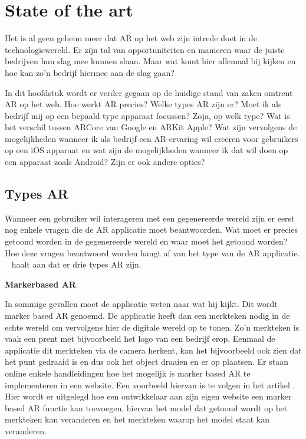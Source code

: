 \chapter{State of the art}
\label{ch:stand-van-zaken}



Het is al geen geheim meer dat AR op het web zijn intrede doet in de technologiewereld. Er zijn tal van opportuniteiten en manieren waar de juiste bedrijven hun slag mee kunnen slaan. Maar wat komt hier allemaal bij kijken en hoe kan zo'n bedrijf hiermee aan de slag gaan? 

In dit hoofdstuk wordt er verder gegaan op de huidige stand van zaken omtrent AR op het web. Hoe werkt AR precies? Welke types AR zijn er? Moet ik als bedrijf mij op een bepaald type apparaat focussen? Zoja, op welk type? Wat is het verschil tussen ARCore van Google en ARKit Apple? Wat zijn vervolgens de mogelijkheden wanneer ik als bedrijf een AR-ervaring wil creëren voor gebruikers op een iOS apparaat en wat zijn de mogelijkheden wanneer ik dat wil doen op een apparaat zoals Android? Zijn er ook andere opties?

\section{Types AR}
\label{sec:types-ar}
Wanneer een gebruiker wil interageren met een gegenereerde wereld zijn er eerst nog enkele vragen die de AR applicatie moet beantwoorden. Wat moet er precies getoond worden in de gegenereerde wereld en waar moet het getoond worden? Hoe deze vragen beantwoord worden hangt af van het type van de AR applicatie. ~\textcite{Paladini2018} haalt aan dat er drie types AR zijn. 

\textbf{Markerbased AR}

In sommige gevallen moet de applicatie weten naar wat hij kijkt. Dit wordt marker based AR genoemd. De applicatie heeft dan een merkteken nodig in de echte wereld om vervolgens hier de digitale wereld op te tonen. Zo'n merkteken is vaak een prent met bijvoorbeeld het logo van een bedrijf erop. Eenmaal de applicatie dit merkteken via de camera herkent, kan het bijvoorbeeld ook zien dat het punt gedraaid is en dus ook het object draaien en er op plaatsen. Er staan online enkele handleidingen hoe het mogelijk is marker based AR te implementeren in een website. Een voorbeeld hiervan is te volgen in het artikel \textcite{Etienne2017}. Hier wordt er uitgelegd hoe een ontwikkelaar aan zijn eigen website een marker based AR functie kan toevoegen, hiervan het model dat getoond wordt op het merkteken kan veranderen en het merkteken waarop het model staat kan veranderen.

